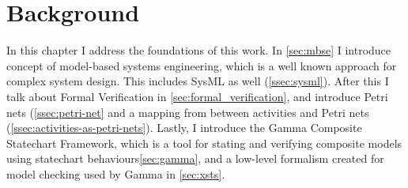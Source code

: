 \chapter{Background}\label{ch:background}

In this chapter I address the foundations of this work. In \autoref{sec:mbse} I introduce concept of model-based systems engineering, which is a well known approach for complex system design. This includes SysML as well (\autoref{ssec:sysml}).  After this I talk about Formal Verification in \autoref{sec:formal_verification}, and introduce Petri nets (\autoref{ssec:petri-net} and a mapping from between activities and Petri nets (\autoref{ssec:activities-as-petri-nets}). Lastly, I introduce the Gamma Composite Statechart Framework, which is a tool for stating and verifying composite models using statechart behaviours\autoref{sec:gamma}, and a low-level formalism created for model checking used by Gamma in \autoref{sec:xsts}.





